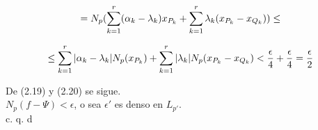 \begin{equation*}
=N_p(\sum_{k=1}^r (\alpha_k - \lambda_k )x_{P_k} + \sum_{k=1}^r \lambda_k (x_{P_k} - x_{Q_k})) \leq 
\end{equation*} 

\begin{equation*}
\leq \sum_{k=1}^r | \alpha_k - \lambda_k | N_p (x_{P_k})+ \sum_{k=1}^r | \lambda_k | N_p (x_{P_k}-x_{Q_k}) < \frac{\epsilon}{4}+ \frac{\epsilon}{4}=\frac{\epsilon}{2}
\end{equation*}

De (2.19) y (2.20) se sigue. \\
$N_p(f-\Psi) < \epsilon$, o sea $\epsilon ' $ es denso en $L_{p '}$. \\
  \phantom{sssssssssssssssssssssssssssssssssss sasdasdasdasdadadssada} c. q. d \\ \\
 
